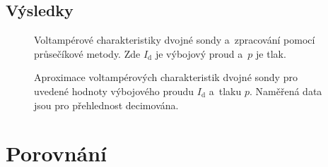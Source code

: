 \documentclass{protokol}
\newcommand\pres{p}
\newcommand\idisch{I_\mathrm{d}}
\begin{document}
\subsection{Výsledky}
\label{sec:results-double}

\begin{figure}
	\centering
	
	
	\par\smallskip
	
	
	\caption{Voltampérové charakteristiky dvojné sondy
		a~zpracování pomocí průsečíkové metody.
		Zde $\idisch$ je výbojový proud a~$\pres$ je tlak.}
	\label{fig:double-vac}
\end{figure}

\begin{figure}
	\centering
	
	\caption{Aproximace voltampérových charakteristik dvojné sondy
		pro uvedené hodnoty výbojového proudu $\idisch$ a~tlaku $\pres$.
		Naměřená data jsou pro přehlednost decimována.}
	\label{fig:double-fit}
\end{figure}

\section{Porovnání}
\label{sec:comparison}
\end{document}
